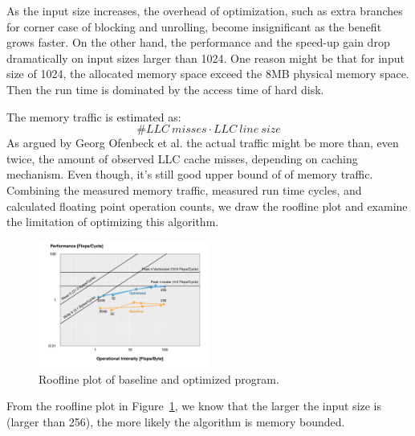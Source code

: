 As the input size increases, the overhead of optimization, such as extra branches for corner case of blocking and unrolling, become insignificant as the benefit grows faster. On the other hand, the performance and the speed-up gain drop dramatically on input sizes larger than 1024. One reason might be that for input size of 1024, the allocated memory space exceed the 8MB physical memory space. Then the run time is dominated by the access time of hard disk.

The memory traffic is estimated as: 
$$
\# LLC\ misses \cdot LLC\ line\ size
$$
As argued by Georg Ofenbeck et al.\cite{ofenbeck2014applying} the actual traffic might be more than, even twice, the amount of observed LLC cache misses, depending on caching mechanism. Even though, it's still good upper bound of of memory traffic. Combining the measured memory traffic, measured run time cycles, and calculated floating point operation counts, we draw the roofline plot and examine the limitation of optimizing this algorithm.

\begin{figure}[h]
\centering
\includegraphics[width=0.5\textwidth]{./pic/roofline.png}
\caption{Roofline plot of baseline and optimized program.}
\label{fig:roofline}
\end{figure}

From the roofline plot in Figure~\ref{fig:roofline}, we know that the larger the input size is (larger than 256), the more likely the algorithm is memory bounded.







